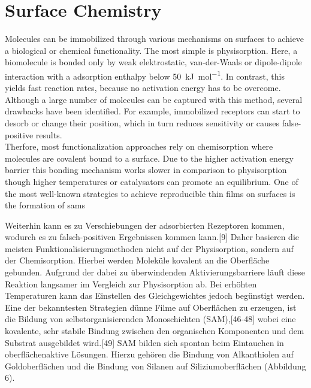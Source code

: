 \subsection{}

\section{Surface Chemistry}
Molecules can be immobilized through various mechanisms on surfaces to achieve a biological or chemical functionality. The most simple is physisorption. Here, a biomolecule is bonded only by weak elektrostatic, van-der-Waals or dipole-dipole interaction with a adsorption enthalpy below \SI{50}{\kilo\joule\per\mole}. In contrast, this yields fast reaction rates, because no activation energy has to be overcome. Although a large number of molecules can be captured with this method, several drawbacks have been identified. \cite{lit:bio:ImmobilizationTechniques, lit:bio:immobilization:UV-ABs}
For example, immobilized receptors can start to desorb or change their position, which in turn reduces sensitivity or causes false-positive results. \cite{lit:bio:physisorp:desorption, lit:chem:surfModOptics} \\
Therfore, most functionalization approaches rely on chemisorption where molecules are covalent bound to a surface. Due to the higher activation energy barrier this bonding mechanism works slower in comparison to physisorption though higher temperatures or catalysators can promote an equilibrium. One of the most well-known strategies to achieve reproducible thin films on surfaces is the formation of \glspl{sam} 

\cite{lit:chem:sin:langeDiss}


Weiterhin kann es zu Verschiebungen der adsorbierten Rezeptoren kommen, wodurch es zu falsch-positiven Ergebnissen kommen kann.[9] Daher basieren die meisten Funktionalisierungsmethoden nicht auf der Physisorption, sondern auf der Chemisorption. Hierbei werden Moleküle kovalent an die Oberfläche gebunden. Aufgrund der dabei zu überwindenden Aktivierungsbarriere läuft diese Reaktion langsamer im Vergleich zur Physisorption ab. Bei erhöhten Temperaturen kann das Einstellen des Gleichgewichtes jedoch begünstigt werden. Eine der bekanntesten Strategien dünne Filme auf Oberflächen zu erzeugen, ist die Bildung von selbstorganisierenden Monoschichten (SAM),[46-48] wobei eine kovalente, sehr stabile Bindung zwischen den organischen Komponenten und dem Substrat ausgebildet wird.[49] SAM bilden sich spontan beim Eintauchen in oberflächenaktive Lösungen. Hierzu gehören die Bindung von Alkanthiolen auf Goldoberflächen und die Bindung von Silanen auf Siliziumoberflächen (Abbildung 6).

